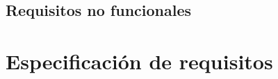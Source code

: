 \subsection{Requisitos no funcionales}\label{requisitos-no-funcionales}


\section{Especificación de requisitos}


